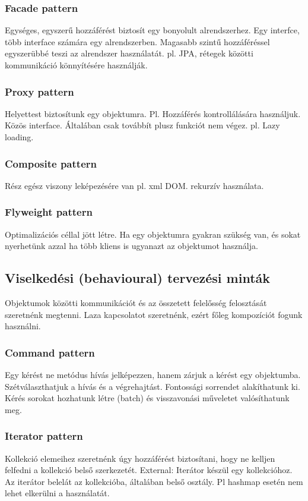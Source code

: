 \documentclass[a4paper,14pt]{extarticle}
\begin{document}
			\subsubsection{Facade pattern}
			Egységes, egyszerű hozzáférést biztosít egy bonyolult alrendszerhez. Egy interfce, több interface számára egy alrendszerben. Magasabb szintű hozzáféréssel egyszerübbé teszi az alrendszer használatát. pl. JPA, rétegek közötti kommunikáció könnyítésére használják.
			
			\subsubsection{Proxy pattern}
			Helyettest biztosítunk egy objektumra. Pl. Hozzáférés kontrollálására használjuk. Közös interface. Általában csak továbbít plusz funkciót nem végez.
			pl. Lazy loading.
			
			\subsubsection{Composite pattern} Rész egész viszony leképezésére van pl. xml DOM. rekurzív használata.
			
			\subsubsection{Flyweight pattern} Optimalizációs céllal jött létre. Ha egy objektumra gyakran szükség van, és sokat nyerhetünk azzal ha több kliens is ugyanazt az objektumot használja.
			
		\subsection{Viselkedési (behavioural) tervezési minták}
			Objektumok közötti kommunikációt és az összetett felelősség felosztását szeretnénk megtenni. Laza kapcsolatot szeretnénk, ezért főleg kompozíciót fogunk használni.
			
			\subsubsection{Command pattern}
			Egy kérést ne metódus hívás jelképezzen, hanem zárjuk a kérést egy objektumba.
			Szétválaszthatjuk a hívás és a végrehajtást. Fontossági sorrendet alakíthatunk ki.
			Kérés sorokat hozhatunk létre (batch) és visszavonási műveletet valósíthatunk meg.
			
			\subsubsection{Iterator pattern}
			Kollekció elemeihez szeretnénk úgy hozzáférést biztosítani, hogy ne kelljen felfedni a kollekció belső szerkezetét. External: Iterátor készül egy kollekcióhoz. Az iterátor belelát az kollekcióba, általában belső osztály. Pl hashmap esetén nem lehet elkerülni a használatát.
			
\end{document}
